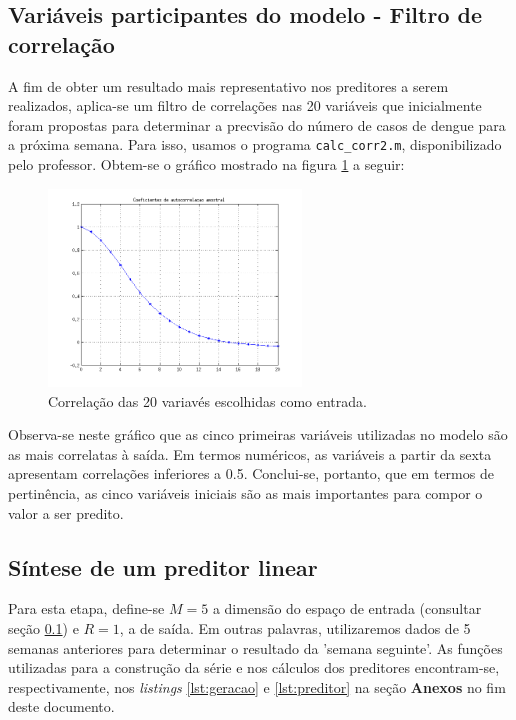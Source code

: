	\FloatBarrier

\subsection{Variáveis participantes do modelo - Filtro de correlação}
 \label{sec:corr}

A fim de obter um resultado mais representativo nos preditores a serem
realizados, aplica-se um filtro de correlações nas 20 variáveis que inicialmente
foram propostas para determinar a precvisão do número de casos de dengue para a
próxima semana. Para isso, usamos o programa \texttt{calc\_corr2.m},
disponibilizado pelo professor. Obtem-se o gráfico mostrado na figura
\ref{fig:corr_variavel} a seguir:

	\begin{figure}[H]
			\centering
			  \includegraphics[width=0.60\textwidth]{image/corr_variaveis_preditor}
			  \caption{Correlação das 20 variavés escolhidas como entrada.} 
			  \label{fig:corr_variavel}
	\end{figure}
	
	\FloatBarrier
	
Observa-se neste gráfico que as cinco primeiras variáveis utilizadas no modelo
são as mais correlatas à saída. Em termos numéricos, as variáveis a partir da
sexta apresentam correlações inferiores a 0.5. Conclui-se, portanto, que em
termos de pertinência, as cinco variáveis iniciais são as mais importantes para
compor o valor a ser predito.

\subsection{Síntese de um preditor linear}
 
Para esta etapa, define-se \(M = 5\) a dimensão do espaço de entrada (consultar
seção \ref{sec:corr}) e \(R = 1\), a de saída. Em outras palavras, utilizaremos
dados de 5 semanas anteriores para determinar o resultado da 'semana seguinte'. As funções
utilizadas para a construção da série e nos cálculos dos preditores encontram-se, respectivamente, nos
\textit{listings} \ref{lst:geracao} e \ref{lst:preditor} na seção
\textbf{Anexos} no fim deste documento.

